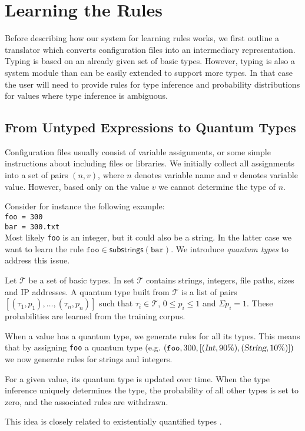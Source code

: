 \section{Learning the Rules}
\label{sec:system}

Before describing how our system for learning rules works, we first outline a translator which converts configuration files into an intermediary representation. Typing is based on an
already given set of basic types. However, typing is also a system module than can be easily extended to support
more types. In that case the user will need to provide rules for type inference and probability distributions for values where type inference is ambiguous.

\subsection{From Untyped Expressions to Quantum Types}

Configuration files usually consist of variable assignments, or some simple instructions about including files or libraries. We initially
collect all assignments into a set of pairs $(n, v)$, where $n$ denotes 
variable name and $v$ denotes variable value. However, based only on the 
value $v$ we cannot determine the type of $n$.

Consider for instance the following example:\\
\texttt{\hspace*{2em}foo = 300\\
\hspace*{2em}bar = 300.txt}\\
Most likely \texttt{foo} is an integer, but it could also be a string.
In the latter case we want to learn the rule $ \texttt{foo} \in \textsf{substrings}(\texttt{bar})$. We introduce {\emph{quantum types}} to 
address this issue.

Let $\mathcal{T}$ be a set of basic types. In \app set $\mathcal{T}$ contains strings, integers, file paths, sizes and IP addresses. 
A quantum type built from $\mathcal{T}$ is a list of pairs $[(\tau_1, p_1),\ldots,(\tau_n, p_n)]$ such that $\tau_i \in \mathcal{T}$, 
$0 \le p_i \le 1$ 
and $\Sigma p_i = 1$. These probabilities are learned from the training 
corpus.

When a value has a quantum type, we generate rules for all its types. This means that by assigning {\texttt{foo}} a quantum type 
(e.g. $(\texttt{foo}, 300, [(\textsl{Int},90\%),(\textsl{String},10\%)])$
we now generate rules for strings and integers.

For a given value, its quantum type is updated over time. When the type inference uniquely determines the type, the probability of all other types is set to zero, and  the associated rules are withdrawn.

This idea is closely related to existentially quantified types \cite{Launchbury93lazyfunctional}.

